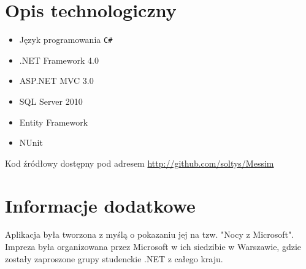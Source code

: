\documentclass{article}
\begin{document}
\section{Opis technologiczny}
\begin{itemize}
\item Język programowania \texttt{C\#}
\item .NET Framework 4.0
\item ASP.NET MVC 3.0
\item SQL Server 2010
\item Entity Framework
\item NUnit
\end{itemize}

Kod źródłowy dostępny pod adresem \url{http://github.com/soltys/Messim}
\section{Informacje dodatkowe}
Aplikacja była tworzona z myślą o pokazaniu jej na tzw. "Nocy z Microsoft". Impreza była organizowana przez Microsoft w ich siedzibie w Warszawie, gdzie zostały zaproszone grupy studenckie .NET z całego kraju.
\end{document}
